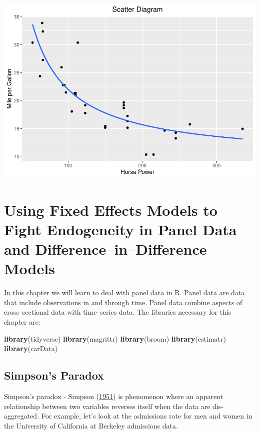 \documentclass[]{book}
\newenvironment{Shaded}{\begin{snugshade}}{\end{snugshade}}
\newcommand{\KeywordTok}[1]{\textcolor[rgb]{0.13,0.29,0.53}{\textbf{#1}}}
\newcommand{\NormalTok}[1]{#1}
\begin{document}
\includegraphics{bailey_files/figure-latex/unnamed-chunk-85-1.pdf}

\hypertarget{chp8}{%
\chapter{Using Fixed Effects Models to Fight Endogeneity in Panel Data and Difference--in--Difference Models}\label{chp8}}

In this chapter we will learn to deal with panel data in R. Panel data are data that include observations in and through time. Panel data combine aspects of cross--sectional data with time--series data. The libraries necessary for this chapter are:

\begin{Shaded}
\begin{Highlighting}[]
\KeywordTok{library}\NormalTok{(tidyverse)}
\KeywordTok{library}\NormalTok{(magrittr)}
\KeywordTok{library}\NormalTok{(broom)}
\KeywordTok{library}\NormalTok{(estimatr)}
\KeywordTok{library}\NormalTok{(carData)}
\end{Highlighting}
\end{Shaded}

\hypertarget{simpsons-paradox}{%
\section{Simpson's Paradox}\label{simpsons-paradox}}

Simpson's paradox - Simpson (\href{https://www.jstor.org/stable/2984065?seq=1\#metadata_info_tab_contents}{1951}) is phenomenon where an apparent relationship between two variables reverses itself when the data are dis-aggregated. For example, let's look at the admissions rate for men and women in the University of California at Berkeley admissions data.
\end{document}
